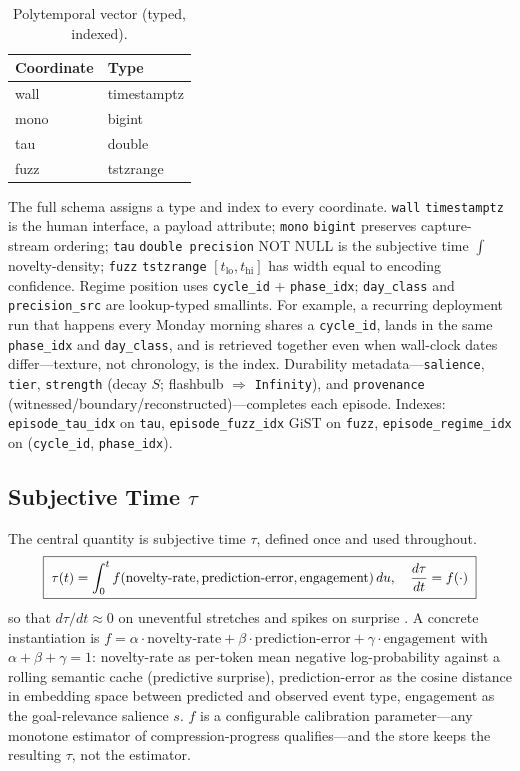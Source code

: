 \documentclass[letterpaper]{article}
\begin{document}
\begin{table}[t]\centering\begin{tabular}{ll}\toprule Coordinate & Type \\ \midrule wall & timestamptz \\ mono & bigint \\ tau & double \\ fuzz & tstzrange \\ \bottomrule\end{tabular}\caption{Polytemporal vector (typed, indexed).}\label{tab:polytemporal}\end{table}

The full schema assigns a type and index to every coordinate. \texttt{wall} \texttt{timestamptz} is the human interface, a payload attribute; \texttt{mono} \texttt{bigint} preserves capture-stream ordering; \texttt{tau} \texttt{double precision} NOT NULL is the subjective time $\int$ novelty-density; \texttt{fuzz} \texttt{tstzrange} $[t_{\text{lo}},t_{\text{hi}}]$ has width equal to encoding confidence. Regime position uses \texttt{cycle\_id} + \texttt{phase\_idx}; \texttt{day\_class} and \texttt{precision\_src} are lookup-typed smallints. For example, a recurring deployment run that happens every Monday morning shares a \texttt{cycle\_id}, lands in the same \texttt{phase\_idx} and \texttt{day\_class}, and is retrieved together even when wall-clock dates differ---texture, not chronology, is the index. Durability metadata---\texttt{salience}, \texttt{tier}, \texttt{strength} (decay $S$; flashbulb $\Rightarrow$ \texttt{Infinity}), and \texttt{provenance} (witnessed/boundary/reconstructed)---completes each episode. Indexes: \texttt{episode\_tau\_idx} on \texttt{tau}, \texttt{episode\_fuzz\_idx} GiST on \texttt{fuzz}, \texttt{episode\_regime\_idx} on (\texttt{cycle\_id}, \texttt{phase\_idx}).

\subsection{Subjective Time $\tau$}
The central quantity is subjective time $\tau$, defined once and used throughout.
\begin{equation}\resizebox{0.9\columnwidth}{!}{$\boxed{\;
\tau(t) = \int_{0}^{t} f(\text{novelty-rate}, \text{prediction-error}, \text{engagement})\,du,
\quad \frac{d\tau}{dt} = f(\cdot)
\;}$}\label{eq:tau}
\end{equation}
so that $d\tau/dt\approx 0$ on uneventful stretches and spikes on surprise \citep{schmidhuber1991curiosity}. A concrete instantiation is $f = \alpha\cdot\text{novelty-rate} + \beta\cdot\text{prediction-error} + \gamma\cdot\text{engagement}$ with $\alpha+\beta+\gamma=1$: novelty-rate as per-token mean negative log-probability against a rolling semantic cache (predictive surprise), prediction-error as the cosine distance in embedding space between predicted and observed event type, engagement as the goal-relevance salience $s$. $f$ is a configurable calibration parameter---any monotone estimator of compression-progress qualifies---and the store keeps the resulting $\tau$, not the estimator.
\end{document}
